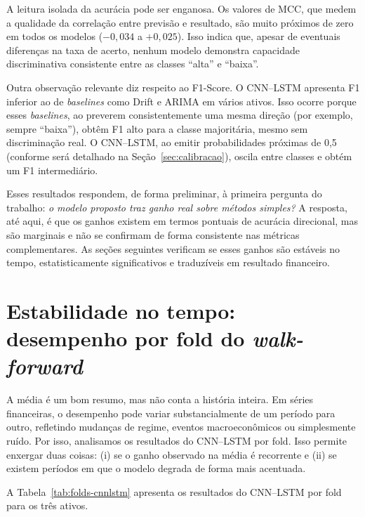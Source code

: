 A leitura isolada da acurácia pode ser enganosa. Os valores de MCC, que medem a qualidade
da correlação entre previsão e resultado, são muito próximos de zero em todos os modelos
($-0{,}034$ a $+0{,}025$). Isso indica que, apesar de eventuais diferenças na taxa de acerto,
nenhum modelo demonstra capacidade discriminativa consistente entre as classes ``alta'' e ``baixa''.

Outra observação relevante diz respeito ao F1-Score. O CNN--LSTM apresenta F1 inferior ao
de \textit{baselines} como Drift e ARIMA em vários ativos. Isso ocorre porque esses \textit{baselines}, ao preverem
consistentemente uma mesma direção (por exemplo, sempre ``baixa''), obtêm F1 alto para a classe
majoritária, mesmo sem discriminação real. O CNN--LSTM, ao emitir probabilidades próximas de 0,5
(conforme será detalhado na Seção~\ref{sec:calibracao}), oscila entre classes e obtém um F1
intermediário.

Esses resultados respondem, de forma preliminar, à primeira pergunta do trabalho:
\emph{o modelo proposto traz ganho real sobre métodos simples?}
A resposta, até aqui, é que os ganhos existem em termos pontuais de acurácia direcional,
mas são marginais e não se confirmam de forma consistente nas métricas complementares.
As seções seguintes verificam se esses ganhos são estáveis no tempo, estatisticamente
significativos e traduzíveis em resultado financeiro.

\section{Estabilidade no tempo: desempenho por fold do \textit{walk-forward}}
\label{sec:estabilidade-folds}

A média é um bom resumo, mas não conta a história inteira. Em séries financeiras,
o desempenho pode variar substancialmente de um período para outro, refletindo mudanças
de regime, eventos macroeconômicos ou simplesmente ruído. Por isso, analisamos os resultados
do CNN--LSTM por fold. Isso permite enxergar duas coisas: (i) se o ganho observado na média
é recorrente e (ii) se existem períodos em que o modelo degrada de forma mais acentuada.

A Tabela~\ref{tab:folds-cnnlstm} apresenta os resultados do CNN--LSTM por fold
para os três ativos.

